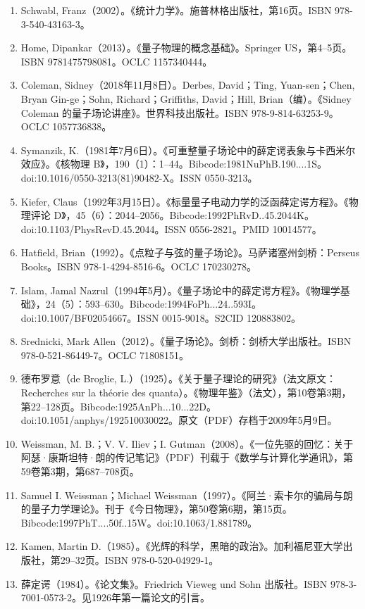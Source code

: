 \begin{enumerate}
\item Schwabl, Franz（2002）。《统计力学》。施普林格出版社，第16页。ISBN 978-3-540-43163-3。
\item Home, Dipankar（2013）。《量子物理的概念基础》。Springer US，第4–5页。ISBN 9781475798081。OCLC 1157340444。
\item Coleman, Sidney（2018年11月8日）。Derbes, David；Ting, Yuan-sen；Chen, Bryan Gin-ge；Sohn, Richard；Griffiths, David；Hill, Brian（编）。《Sidney Coleman 的量子场论讲座》。世界科技出版社。ISBN 978-9-814-63253-9。OCLC 1057736838。
\item Symanzik, K.（1981年7月6日）。《可重整量子场论中的薛定谔表象与卡西米尔效应》。《核物理 B》，190（1）：1–44。Bibcode:1981NuPhB.190....1S。doi:10.1016/0550-3213(81)90482-X。ISSN 0550-3213。
\item Kiefer, Claus（1992年3月15日）。《标量量子电动力学的泛函薛定谔方程》。《物理评论 D》，45（6）：2044–2056。Bibcode:1992PhRvD..45.2044K。doi:10.1103/PhysRevD.45.2044。ISSN 0556-2821。PMID 10014577。
\item Hatfield, Brian（1992）。《点粒子与弦的量子场论》。马萨诸塞州剑桥：Perseus Books。ISBN 978-1-4294-8516-6。OCLC 170230278。
\item Islam, Jamal Nazrul（1994年5月）。《量子场论中的薛定谔方程》。《物理学基础》，24（5）：593–630。Bibcode:1994FoPh...24..593I。doi:10.1007/BF02054667。ISSN 0015-9018。S2CID 120883802。
\item Srednicki, Mark Allen（2012）。《量子场论》。剑桥：剑桥大学出版社。ISBN 978-0-521-86449-7。OCLC 71808151。
\item 德布罗意（de Broglie, L.）（1925）。《关于量子理论的研究》（法文原文：Recherches sur la théorie des quanta）。《物理年鉴》（法文），第10卷第3期，第22–128页。Bibcode:1925AnPh...10...22D。doi:10.1051/anphys/192510030022。原文（PDF）存档于2009年5月9日。
\item Weissman, M. B.；V. V. Iliev；I. Gutman（2008）。《一位先驱的回忆：关于阿瑟·康斯坦特·朗的传记笔记》（PDF）刊载于《数学与计算化学通讯》，第59卷第3期，第687–708页。
\item Samuel I. Weissman；Michael Weissman（1997）。《阿兰·索卡尔的骗局与朗的量子力学理论》。刊于《今日物理》，第50卷第6期，第15页。Bibcode:1997PhT....50f..15W。doi:10.1063/1.881789。
\item Kamen, Martin D.（1985）。《光辉的科学，黑暗的政治》。加利福尼亚大学出版社，第29–32页。ISBN 978-0-520-04929-1。
\item 薛定谔（1984）。《论文集》。Friedrich Vieweg und Sohn 出版社。ISBN 978-3-7001-0573-2。见1926年第一篇论文的引言。

\end{enumerate}
